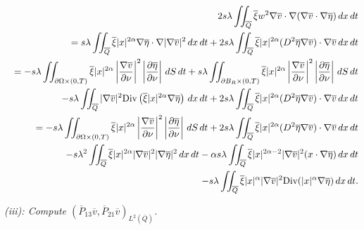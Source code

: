 \documentclass[11pt]{article}
\numberwithin{equation}{section}
\begin{document}
\begin{eqnarray*}
	&&2s\lambda \iint_{\overline{Q}} \overline{\xi} w^2 \nabla \overline{v} \cdot \nabla (\nabla \overline{v} \cdot \nabla \overline{\eta}) \, dx \, dt\\
	&&= s\lambda \iint_{\overline{Q}} \overline{\xi} |x|^{2\alpha} \nabla \overline{\eta} \cdot \nabla |\nabla \overline{v}|^2 \, dx \, dt + 2s\lambda \iint_{\overline{Q}} \overline{\xi} |x|^{2\alpha} (D^2 \overline{\eta} \nabla \overline{v}) \cdot \nabla \overline{v} \, dx \, dt\\
	&&= -s\lambda \iint_{\partial \Omega \times (0,T)} \overline{\xi} |x|^{2\alpha} \left|\frac{\nabla \overline{v}}{\partial \nu}\right|^2 \left|\frac{\partial \overline{\eta}}{\partial \nu}\right| \, dS \, dt + s\lambda \iint_{\partial B_R \times (0,T)} \overline{\xi} |x|^{2\alpha} \left|\frac{\nabla \overline{v}}{\partial \nu}\right|^2 \left|\frac{\partial \overline{\eta}}{\partial \nu}\right| \, dS \, dt\\
	&&\hspace{4.5mm} - s\lambda \iint_{\overline{Q}} |\nabla \overline{v}|^2 \text{Div} \left(\overline{\xi} |x|^{2\alpha} \nabla \overline{\eta}\right) \, dx \, dt + 2s\lambda \iint_{\overline{Q}} \overline{\xi} |x|^{2\alpha} (D^2 \overline{\eta} \nabla \overline{v}) \cdot \nabla \overline{v} \, dx \, dt\\
	&&= -s\lambda \iint_{\partial \Omega \times (0,T)} \overline{\xi} |x|^{2\alpha} \left|\frac{\nabla \overline{v}}{\partial \nu}\right|^2 \left|\frac{\partial \overline{\eta}}{\partial \nu}\right| \, dS \, dt + 2s\lambda \iint_{\overline{Q}} \overline{\xi} |x|^{2\alpha} (D^2 \overline{\eta} \nabla \overline{v}) \cdot \nabla \overline{v} \, dx \, dt\\
	&&\hspace{4.5mm} - s\lambda^2 \iint_{\overline{Q}} \overline{\xi} |x|^{2\alpha} |\nabla \overline{v}|^2 |\nabla \overline{\eta}|^2 \, dx \, dt - \alpha s\lambda \iint_{\overline{Q}} \overline{\xi} |x|^{2\alpha-2} |\nabla \overline{v}|^2 (x \cdot \nabla \overline{\eta}) \, dx \, dt\\
	&&\hspace{4.5mm} - s\lambda \iint_{\overline{Q}} \overline{\xi} |x|^\alpha |\nabla \overline{v}|^2 \text{Div}(|x|^\alpha \nabla \overline{\eta}) \, dx \, dt.
\end{eqnarray*}



{\it (iii): Compute $(\overline{P}_{13}\overline{v}, \overline{P}_{21}\overline{v})_{L^2(\overline{Q})}$.}
\end{document}

